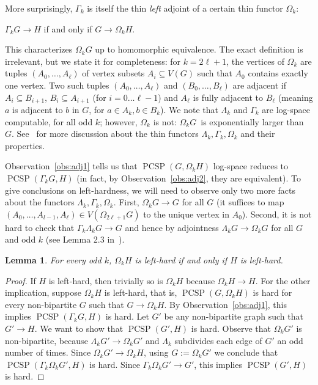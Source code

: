 \documentclass[11pt,a4paper]{scrartcl}
\numberwithin{theorem}{section}
\newtheorem{lemma}[theorem]{Lemma}
\theoremstyle{definition}
\DeclareMathOperator{\PCSP}{PCSP}
\begin{document}
\noindent
More surprisingly, $\Gamma_k$ is itself the thin \emph{left} adjoint of a certain thin functor $\Omega_k$:
\begin{center}
	$\Gamma_k G \to H$ if and only if $G \to \Omega_k H$.
\end{center}
This characterizes $\Omega_k G$ up to homomorphic equivalence.
The exact definition is irrelevant, but we state it for completeness:
for $k=2\ell+1$, the vertices of $\Omega_k$ are tuples $(A_0,\dots,A_\ell)$ of vertex subsets $A_i \subseteq V(G)$ such that $A_0$ contains exactly one vertex.
Two such tuples $(A_0,\dots,A_\ell)$ and $(B_0,\dots,B_\ell)$ are adjacent if
$A_i \subseteq B_{i+1}$, $B_i \subseteq A_{i+1}$ (for $i=0\dots \ell-1$) and $A_\ell$ is fully adjacent to $B_\ell$ (meaning $a$ is adjacent to $b$ in $G$, for $a \in A_k, b \in B_k$).
We note that $\Lambda_k$ and $\Gamma_k$ are log-space computable, for all odd $k$;
however, $\Omega_k$ is not: $\Omega_k G$~is exponentially larger than $G$.
See~\cite{Wrochna17b} for more discussion about the thin functors $\Lambda_k,\Gamma_k,\Omega_k$ and their properties.

Observation~\ref{obs:adj1} tells us that $\PCSP(G, \Omega_k H)$ log-space reduces to $\PCSP(\Gamma_k G, H)$ (in fact, by Observation~\ref{obs:adj2}, they are equivalent).
To give conclusions on left-hardness, we will need to observe only two more facts about the functors $\Lambda_k,\Gamma_k,\Omega_k$.
First, $\Omega_k G \to G$ for all $G$ (it suffices to map $(A_0,\dots,A_{l-1},A_\ell) \in V(\Omega_{2\ell+1} G)$ to the unique vertex in $A_0$).
Second, it is not hard to check that $\Gamma_k \Lambda_k G \to G$ and hence by adjointness $\Lambda_k G \to \Omega_k G$ for all $G$ and odd $k$ (see Lemma 2.3 in~\cite{Wrochna17b}).


\begin{lemma}\label{lem:left-hard}
	For every odd $k$, $\Omega_k H$ is left-hard if and only if $H$ is left-hard.
\end{lemma}
\begin{proof}
	If $H$ is left-hard, then trivially so is $\Omega_k H$ because $\Omega_k H \to H$.
	For the other implication, suppose $\Omega_k H$ is left-hard, that is,
	$\PCSP(G, \Omega_k H)$ is hard for every non-bipartite $G$ such that $G \to \Omega_k H$.
	By Observation~\ref{obs:adj1}, this implies $\PCSP(\Gamma_k G, H)$ is hard.
	Let $G'$ be any non-bipartite graph such that $G' \to H$.
	We want to show that $\PCSP(G', H)$ is hard.
	Observe that $\Omega_k G'$ is non-bipartite, because $\Lambda_k G' \to \Omega_k G'$ and $\Lambda_k$ subdivides each edge of $G'$ an odd number of times.
	Since $\Omega_k G' \to \Omega_k H$,
	using $G := \Omega_k G'$ we conclude that $\PCSP(\Gamma_k \Omega_k G', H)$ is hard.
	Since $\Gamma_k \Omega_k G' \to G'$,
	this implies $\PCSP(G', H)$ is hard.
\end{proof}
\end{document}
